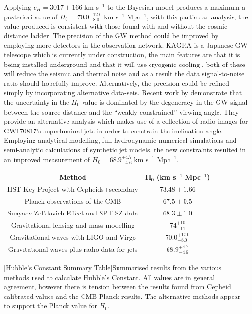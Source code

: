 \documentclass[12pt, onecolumn]{revtex4}    %
\begin{document}
Applying $v_H=3017\pm166$ km s$^{-1}$ to the Bayesian model produces a maximum a posteriori value of $H_0=70.0^{+12.0}_{-8.0}$ km s$^{-1}$ Mpc$^{-1}$, with this particular analysis, the value produced is consistent with those found with and without the cosmic distance ladder. The precision of the GW method could be improved by employing more detectors in the observation network. KAGRA is a Japanese GW telescope which is currently under construction, the main features are that it is being installed underground and that it will use cryogenic cooling \citep{1742-6596-610-1-012016}, both of these will reduce the seismic and thermal noise and as a result the data signal-to-noise ratio should hopefully improve. Alternatively, the precision could be refined simply by incorporating alternative data-sets. Recent work by \cite{2018arXiv180610596H} demonstrate that the uncertainty in the \cite{2017Natur.551...85A} $H_0$ value is dominated by the degeneracy in the GW signal between the source distance and the ``weakly constrained'' viewing angle. They provide an alternative analysis which makes use of a collection of radio images for GW170817's superluminal jets in order to constrain the inclination angle. Employing analytical modelling, full hydrodynamic numerical simulations and semi-analytic calculations of synthetic jet models, the new constraints resulted in an improved measurement of  $H_0=68.9^{+4.7}_{-4.6}$ km s$^{-1}$ Mpc$^{-1}$. \\

\begin{center}
\renewcommand{\arraystretch}{1.0}
\begin{tabular}{c@{\hskip 20pt}c} 
 \hline
 \textbf{Method} & $\boldsymbol{H_0}$ \textbf{(km s$^{-1}$ Mpc$^{-1}$)} \\ [0.5ex] 
 HST Key Project with Cepheids+secondary & $73.48\pm1.66$ \\
 Planck observations of the CMB & $67.5\pm0.5$\\
 Sunyaev-Zel'dovich Effect and SPT-SZ data & $68.3\pm1.0$ \\
 Gravitational lensing and mass modelling & $74^{+10}_{-11}$ \\
 Gravitational waves with LIGO and Virgo & $70.0^{+12.0}_{-8.0}$ \\
 Gravitational waves plus radio data for jets & $68.9^{+4.7}_{-4.6}$ \\
 \hline
\end{tabular}
[Hubble's Constant Summary Table]{Summarised results from the various methods used to calculate Hubble's Constant. All values are in general agreement, however there is tension between the results found from Cepheid calibrated values and the CMB Planck results. The alternative methods appear to support the Planck value for $H_0$.}
\label{table:spectral_classification}
\end{center}
\end{document}
